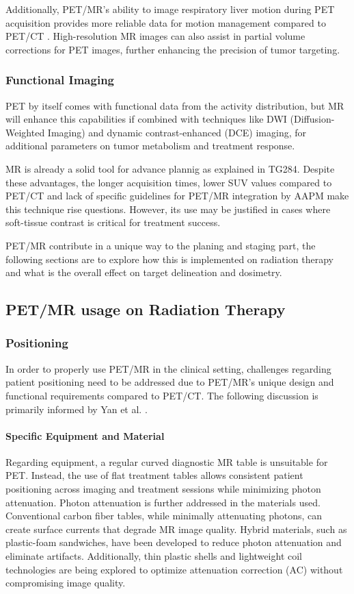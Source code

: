 \documentclass[11pt]{article} %
\begin{document}
\begin{multicols}{2}
Additionally, PET/MR’s ability to image respiratory liver motion during PET acquisition provides more reliable data for motion management compared to PET/CT \cite{knesaurek2018}. High-resolution MR images can also assist in partial volume corrections for PET images, further enhancing the precision of tumor targeting.

\subsubsection{Functional Imaging}
PET by itself comes with functional data from the activity distribution, but MR will enhance this capabilities if combined with techniques like DWI (Diffusion-Weighted Imaging) and dynamic contrast-enhanced (DCE) imaging, for additional parameters on tumor metabolism and treatment response. 

MR is already a solid tool for advance plannig as explained in TG284\cite{TG284}. Despite these advantages, the longer acquisition times, lower SUV values compared to PET/CT and lack of specific guidelines for PET/MR integration by AAPM make this technique rise questions. However, its use may be justified in cases where soft-tissue contrast is critical for treatment success.

PET/MR contribute in a unique way to the planing and staging part, the following sections are to explore how this is implemented on radiation therapy and what is the overall effect on target delineation and dosimetry.


\subsection{PET/MR usage on Radiation Therapy}


\subsubsection{Positioning}
In order to properly use PET/MR in the clinical setting, challenges regarding patient positioning need to be addressed due to PET/MR's unique design and functional requirements compared to PET/CT. The following discussion is primarily informed by Yan et al. \cite{yan2024}.

\paragraph{Specific Equipment and Material}
Regarding equipment, a regular curved diagnostic MR table is unsuitable for PET. Instead, the use of flat treatment tables allows consistent patient positioning across imaging and treatment sessions while minimizing photon attenuation. Photon attenuation is further addressed in the materials used. Conventional carbon fiber tables, while minimally attenuating photons, can create surface currents that degrade MR image quality. Hybrid materials, such as plastic-foam sandwiches, have been developed to reduce photon attenuation and eliminate artifacts. Additionally, thin plastic shells and lightweight coil technologies are being explored to optimize attenuation correction (AC) without compromising image quality.


\end{multicols}
\end{document}
